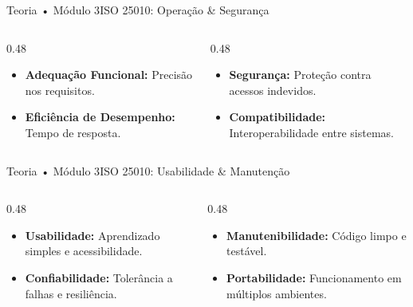 \begin{senaiframe}{Teoria • Módulo 3}{ISO 25010: Operação \& Segurança}
  \begin{columns}[t]
    \begin{column}{0.48\textwidth}
      \begin{tcolorbox}[senairedcard, title={Adequação \& Eficiência}]
        \begin{itemize}
          \item \textbf{Adequação Funcional:} Precisão nos requisitos.
          \item \textbf{Eficiência de Desempenho:} Tempo de resposta.
        \end{itemize}
      \end{tcolorbox}
    \end{column}
    \begin{column}{0.48\textwidth}
      \begin{tcolorbox}[senaiambercard, title={Segurança \& Compatibilidade}]
        \begin{itemize}
          \item \textbf{Segurança:} Proteção contra acessos indevidos.
          \item \textbf{Compatibilidade:} Interoperabilidade entre sistemas.
        \end{itemize}
      \end{tcolorbox}
    \end{column}
  \end{columns}
\end{senaiframe}

\begin{senaiframe}{Teoria • Módulo 3}{ISO 25010: Usabilidade \& Manutenção}
  \begin{columns}[t]
    \begin{column}{0.48\textwidth}
      \begin{tcolorbox}[senaibluecard, title={Usabilidade \& Confiabilidade}]
        \begin{itemize}
          \item \textbf{Usabilidade:} Aprendizado simples e acessibilidade.
          \item \textbf{Confiabilidade:} Tolerância a falhas e resiliência.
        \end{itemize}
      \end{tcolorbox}
    \end{column}
    \begin{column}{0.48\textwidth}
      \begin{tcolorbox}[senaigreencard, title={Manutenção \& Portabilidade}]
        \begin{itemize}
          \item \textbf{Manutenibilidade:} Código limpo e testável.
          \item \textbf{Portabilidade:} Funcionamento em múltiplos ambientes.
        \end{itemize}
      \end{tcolorbox}
    \end{column}
  \end{columns}
\end{senaiframe}

